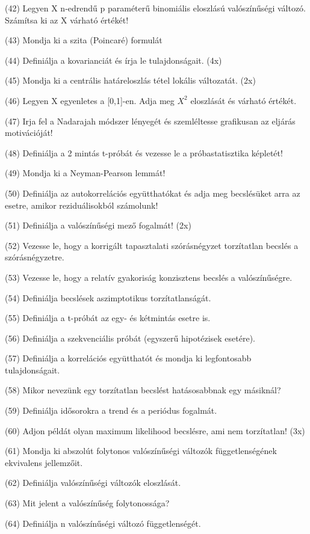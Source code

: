 \documentclass[12p]{article}
\begin{document}
(42) Legyen X n-edrendű p paraméterű binomiális eloszlású valószínűségi változó. Számítsa ki az X várható értékét! 

(43) Mondja ki a szita (Poincaré) formulát

(44) Definiálja a kovarianciát és írja le tulajdonságait. (4x)

(45) Mondja ki a centrális határeloszlás tétel lokális változatát. (2x)

(46) Legyen X egyenletes a [0,1]-en. Adja meg $X^2$ eloszlását és várható értékét.

(47) Irja fel a Nadarajah módszer lényegét és szemléltesse grafikusan az eljárás motivációját! 

(48) Definiálja a 2 mintás t-próbát és vezesse le a próbastatisztika képletét! 

(49) Mondja ki a Neyman-Pearson lemmát!

(50) Definiálja az autokorrelációs együtthatókat és adja meg becslésüket arra az esetre, amikor reziduálisokból számolunk! 

(51) Definiálja a valószínűségi mező fogalmát! (2x)

(52) Vezesse le, hogy a korrigált tapasztalati szórásnégyzet torzítatlan becslés a szórásnégyzetre. 

(53) Vezesse le, hogy a relatív gyakoriság konzisztens becslés a valószínűségre.

(54) Definiálja becslések aszimptotikus torzítatlanságát.

(55) Definiálja a t-próbát az egy- és kétmintás esetre is.

(56) Definiálja a szekvenciális próbát (egyszerű hipotézisek esetére).

(57) Definiálja a korrelációs együtthatót és mondja ki legfontosabb tulajdonságait.

(58) Mikor nevezünk egy torzítatlan becslést hatásosabbnak egy másiknál?

(59) Definiálja idősorokra a trend és a periódus fogalmát.

(60) Adjon példát olyan maximum likelihood becslésre, ami nem torzítatlan! (3x)

(61) Mondja ki abszolút folytonos valószínűségi változók függetlenségének ekvivalens jellemzőit.

(62) Definiálja valószínűségi változók eloszlását.

(63) Mit jelent a valószínűség folytonossága?

(64) Definiálja n valószínűségi változó függetlenségét.
\end{document}
